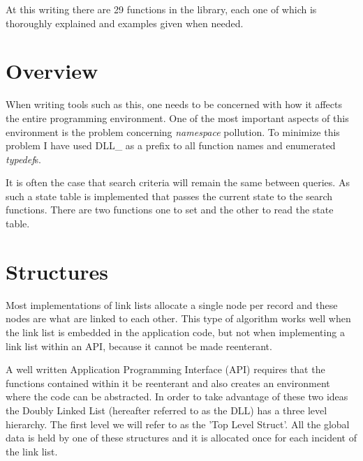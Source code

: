 \documentclass[10pt,letterpaper,titlepage]{article}
\begin{document}
\noindent
At this writing there are 29 functions in the library, each one of which is thoroughly explained and examples given when needed.
\pagebreak

\section{Overview}
When writing tools such as this, one needs to be concerned with how it affects the entire programming environment.  One of the most important aspects of this environment is the problem concerning \emph{namespace} pollution.  To minimize this problem I have used DLL\_ as a prefix to all function names and enumerated \emph{typedef}s.
\vspace{8pt}

\noindent
It is often the case that search criteria will remain the same between queries.  As such a state table is implemented that passes the current state to the search functions.  There are two functions one to set and the other to read the state table.





\pagebreak

\section{Structures}
Most implementations of link lists allocate a single node per record and these nodes are what are linked to each other.  This type of algorithm works well when the link list is embedded in the application code, but not when implementing a link list within an API, because it cannot be made reenterant.
\vspace{8pt}

\noindent
A well written Application Programming Interface (API) requires that the functions contained within it be reenterant and also creates an environment where the code can be abstracted.  In order to take advantage of these two ideas the Doubly Linked List (hereafter referred to as the DLL) has a three level hierarchy.  The first level we will refer to as the 'Top Level Struct'.  All the global data is held by one of these structures and it is allocated once for each incident of the link list.  

\end{document}
